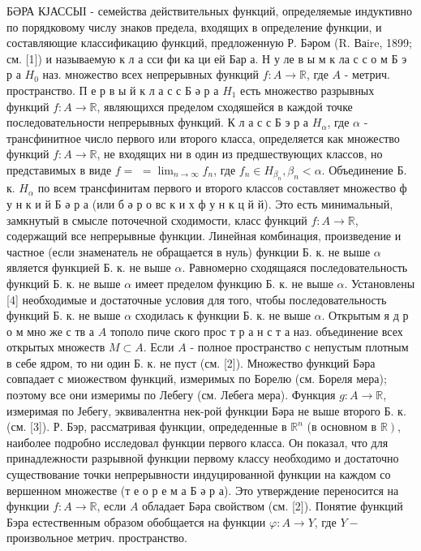 \documentclass[10pt]{article}
\begin{document}
БӘРА КЈАССЫІ - семейства действительных функций, определяемые индуктивно по порядковому числу знаков предела, входящих в определение функции, и составляющие классификацию функций, предложенную Р. Бәром (R. Ваire, 1899; см. [1]) и называемую к л а сси фи ка ци ей Бар а. Н у ле в ы м к ла с с о м Б э р а $H_{0}$ наз. множество всех непрерывных функций $f: A \rightarrow \mathbb{R}$, где $A$ - метрич. пространство. П е р в ы й к л а с с Б ә р а $H_{1}$ есть множество разрывных функций $f: A \rightarrow \mathbb{R}$, являющихся пределом сходяшейся в каждой точке последовательности непрерывных функций. К л а с с Б э р а $H_{\alpha}$, где $\alpha$ - трансфинитное число первого или второго класса, определяется как множество функций $f: A \rightarrow \mathbb{R}$, не входящих ни в один из предшествующих классов, но представимых в виде $f=$ $=\lim _{n \rightarrow \infty} f_{n}$, где $f_{n} \in H_{\beta_{n}}, \beta_{n}<\alpha$. Объединение Б. к. $H_{\alpha}$ по всем трансфинитам первого и второго классов составляет множество ф у н к и й Б ә р а (или б ә р о вс к и х ф у н к ц й й). Это есть минимальный, замкнутый в смысле поточечной сходимости, класс функций $f: A \rightarrow \mathbb{R}$, содержащий все непрерывные функции. Линейная комбинация, произведение и частное (если знаменатель не обращается в нуль) функции Б. к. не выше $\alpha$ является функцией Б. к. не выше $\alpha$. Равномерно сходящаяся последовательность функций Б. к. не выше $\alpha$ имеет пределом функцию Б. к. не выше $\alpha$. Установлены [4] необходимые и достаточные условия для того, чтобы последовательность функций Б. к. не выше $\alpha$ сходилась к функции Б. к. не выше $\alpha$. Открытым я д р о м мно же с тв а $A$ тополо пиче ского прос т р а н с т а наз. объединение всех открытых множеств $M \subset A$. Если $A$ - полное пространство с непустым плотным в себе ядром, то ни один Б. к. не пуст (см. [2]). Множество функций Бәра совпадает с миожеством функций, измеримых по Борелю (см. Бореля мера); поэтому все они измеримы по Лебегу (см. Лебега мера). Функция $g: A \rightarrow \mathbb{R}$, измеримая по Јебегу, эквивалентна нек-рой функции Бәра не выше второго Б. к. (см. [3]). Р. Бэр, рассматривая функции, опредеденные в $\mathbb{R}^{n}$ (в основном в $\left.\mathbb{R}\right)$, наиболее подробно исследовал функции первого класса. Он показал, что для принадлежности разрывной функции первому классу необходимо и достаточно существование точки непрерывности индуцированной функции на каждом со вершенном множестве (т е о р е м а Б ә р а). Это утверждение переносится на функции $f: A \rightarrow \mathbb{R}$, если $A$ обладает Бәра свойством (см. [2]). Понятие функций Бэра естественным образом обобщается на функции $\varphi: A \rightarrow Y$, где $Y-$ произвольное метрич. пространство.
\end{document}
